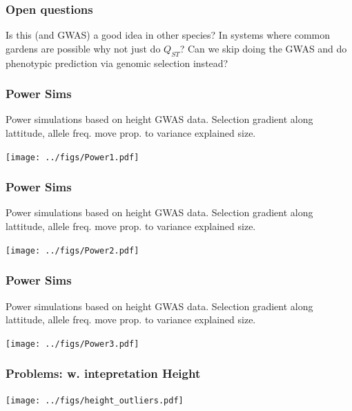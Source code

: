 \documentclass{beamer}
\begin{document}
\begin{frame}
\frametitle{Open questions}

Is this (and GWAS) a good idea in other species?
In systems where common gardens are possible why not just do $Q_{ST}$?
Can we skip doing the GWAS and do phenotypic prediction via genomic selection instead?

\end{frame}




\begin{frame}
	\frametitle{Power Sims}
Power simulations based on height GWAS data. Selection gradient
along lattitude, allele freq. move prop. to variance explained size.  
	\begin{center}
	\texttt{[image: ../figs/Power1.pdf]}
\end{center}
\end{frame}


\begin{frame}
	\frametitle{Power Sims}
Power simulations based on height GWAS data. Selection gradient
along lattitude, allele freq. move prop. to variance explained size.  
	\begin{center}
	\texttt{[image: ../figs/Power2.pdf]}
\end{center}
\end{frame}


\begin{frame}
	\frametitle{Power Sims}
Power simulations based on height GWAS data. Selection gradient
along lattitude, allele freq. move prop. to variance explained size.  
	\begin{center}
	\texttt{[image: ../figs/Power3.pdf]}
\end{center}
\end{frame}

\begin{frame}
	\frametitle{Problems: w. intepretation Height}
	\texttt{[image: ../figs/height\_outliers.pdf]}
\end{frame}
\end{document}
